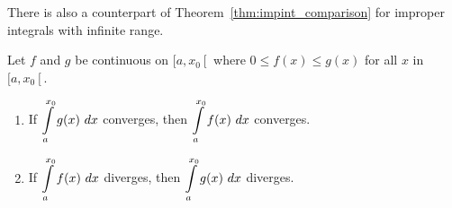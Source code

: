 There is also a counterpart of Theorem~\ref{thm:impint_comparison} for improper integrals with infinite range. 

\begin{theorem}\label{thm:impint_comparison2}
Let $f$ and $g$ be continuous on $[a,x_0\left[\right.$ where $0\leq f(x)\leq g(x)$ for all $x$ in $[a,x_0\left[\right.$. 
	\begin{enumerate}
	\item		If $\ds \int\limits_a^{x_0} g(x)\ dx$ converges, then $\ds \int\limits_a^{x_0} f(x)\ dx$ converges.
	\item		If $\ds \int\limits_a^{x_0} f(x)\ dx$ diverges, then $\ds \int\limits_a^{x_0} g(x)\ dx$ diverges.
	\end{enumerate}
	\end{theorem}
	

\fi


